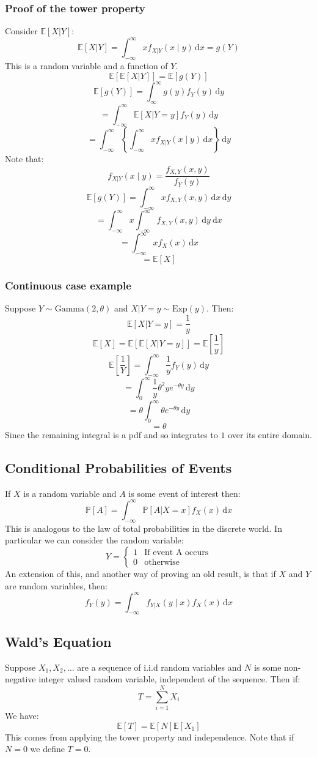 \documentclass[12pt]{article}
\begin{document}
\subsubsection{Proof of the tower property}
Consider \(\mathbb{E}[X|Y]\):
\[\mathbb{E}[X|Y]=\int^\infty_{-\infty}xf_{X|Y}(x\mid y)\,\text{d}x = g(Y)\]
This is a random variable and a function of \(Y\).
\[\mathbb{E}[\mathbb{E}[X|Y]]=\mathbb{E}[g(Y)]\]
\[\mathbb{E}[g(Y)]=\int^\infty_{\infty}g(y)f_Y(y)\,\text{d}y\]
\[=\int^\infty_{-\infty}\mathbb{E}[X|Y=y]f_Y(y)\,\text{d}y\]
\[=\int^\infty_{-\infty}\left\{\int^\infty_{-\infty}xf_{X|Y}(x\mid y)\,\text{d}x\right\}\,\text{d}y\]
Note that:
\[f_{X|Y}(x\mid y)=\frac{f_{X,Y}(x,y)}{f_Y(y)}\]
\[\mathbb{E}[g(Y)]=\int^\infty_{-\infty}xf_{X,Y}(x,y)\,\text{d}x\,\text{d}y\]
\[=\int^\infty_{-\infty}x\int^\infty_{-\infty}f_{X,Y}(x,y)\,\text{d}y\ \text{d}x\]
\[=\int^\infty_{-\infty}xf_X(x)\,\text{d}x\]
\[=\mathbb{E}[X]\]
\subsubsection{Continuous case example}
Suppose \(Y\sim\text{Gamma}(2,\theta)\) and \(X|Y=y\sim\text{Exp}(y)\). Then:
\[\mathbb{E}[X|Y=y]=\frac{1}{y}\]
\[\mathbb{E}[X]=\mathbb{E}[\mathbb{E}[X|Y=y]]=\mathbb{E}\left[\frac{1}{y}\right]\]
\[\mathbb{E}\left[\frac{1}{Y}\right]=\int^\infty_{-\infty}\frac{1}{y}f_Y(y)\,\text{d}y\] 
\[=\int^\infty_0\frac{1}{y}\theta^2ye^{-\theta y}\,\text{d}y\]
\[=\theta\int^\infty_0\theta e^{-\theta y}\,\text{d}y\]
\[=\theta\]
Since the remaining integral is a pdf and so integrates to \(1\) over its entire domain.
\subsection{Conditional Probabilities of Events}
If \(X\) is a random variable and \(A\) is some event of interest then:
\[\mathbb{P}[A]=\int^\infty_{-\infty}\mathbb{P}[A|X=x]f_X(x)\,\text{d}x\]
This is analogous to the law of total probabilities in the discrete world. In particular we can consider the random variable:
\[Y=\begin{cases}
    1 & \text{If event A occurs} \\
    0 & \text{otherwise}
\end{cases}\]
An extension of this, and another way of proving an old result, is that if \(X\) and \(Y\) are random variables, then:
\[f_Y(y)=\int^\infty_{-\infty}f_{Y|X}(y\mid x)f_X(x)\,\text{d}x\]
\subsection{Wald's Equation}
Suppose \(X_1,X_2,\dots\) are a sequence of i.i.d random variables and \(N\) is some non-negative integer valued random variable, independent of the sequence. Then if:
\[T=\sum^N_{i=1}X_i\]
We have:
\[\mathbb{E}[T]=\mathbb{E}[N]\mathbb{E}[X_1]\]
This comes from applying the tower property and independence. Note that if \(N=0\) we define \(T=0\).
\end{document}

